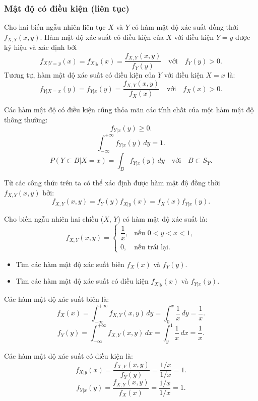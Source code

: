 \documentclass[12pt,a4paper]{article}
\begin{document}
\subsubsection{Mật độ có điều kiện (liên tục)}

\begin{dinhnghia}
Cho hai biến ngẫu nhiên liên tục $X$ và $Y$ có hàm mật độ xác suất đồng thời $f_{X,Y}(x, y)$. Hàm mật độ xác suất có điều kiện của $X$ với điều kiện $Y = y$ được ký hiệu và xác định bởi
\[
  f_{X|Y =y}(x) = f_{X|y}(x) = \dfrac{f_{X,Y}(x, y)}{f_Y(y)} \quad \text{với} \quad f_Y(y) > 0.
\]
Tương tự, hàm mật độ xác suất có điều kiện của $Y$ với điều kiện $X = x$ là:
\[
  f_{Y|X=x}(y) = f_{Y|x}(y) = \dfrac{f_{X,Y}(x, y)}{f_X(x)} \quad \text{với} \quad f_X(x) > 0.
\]
\end{dinhnghia}

\begin{dinhly}
Các hàm mật độ có điều kiện cũng thỏa mãn các tính chất của một hàm mật độ thông thường:
\[
  f_{Y|x}(y) \ge 0.
\]
\[
  \displaystyle\int_{-\infty}^{+\infty} f_{Y|x}(y) \, dy = 1.
\]
\[
  P(Y \subset B|X = x) = \displaystyle\int_{B} f_{Y|x}(y) \, dy \quad \text{với} \quad B \subset S_Y.
\]

Từ các công thức trên ta có thể xác định được hàm mật độ đồng thời $f_{X,Y}(x, y)$ bởi:
\[
  f_{X,Y}(x, y) = f_Y(y)f_{X|y}(x) = f_X(x)f_{Y|x}(y).
\]
\end{dinhly}

\begin{vidu}
Cho biến ngẫu nhiên hai chiều ($X$, $Y$) có hàm mật độ xác suất là:
\[
  f_{X,Y}(x, y) = \begin{cases}
    \dfrac{1}{x}, & \text{nếu } 0 < y < x < 1, \\
    0, & \text{nếu trái lại}.
  \end{cases}
\]
\begin{itemize}
  \item Tìm các hàm mật độ xác suất biên $f_X(x)$ và $f_Y(y)$.
  \item Tìm các hàm mật độ xác suất có điều kiện $f_{X|y}(x)$ và $f_{Y|x}(y)$.
\end{itemize}
Các hàm mật độ xác suất biên là:
\[
  f_X(x) = \displaystyle\int_{-\infty}^{+\infty} f_{X,Y}(x, y) \, dy = \displaystyle\int_{0}^{x} \dfrac{1}{x} \, dy = \dfrac{1}{x}.
\]
\[
  f_Y(y) = \displaystyle\int_{-\infty}^{+\infty} f_{X,Y}(x, y) \, dx = \displaystyle\int_{y}^{1} \dfrac{1}{x} \, dx = \dfrac{1}{x}.
\]

Các hàm mật độ xác suất có điều kiện là:
\[
  f_{X|y}(x) = \dfrac{f_{X,Y}(x, y)}{f_Y(y)} = \dfrac{1/x}{1/x} = 1.
\]
\[
  f_{Y|x}(y) = \dfrac{f_{X,Y}(x, y)}{f_X(x)} = \dfrac{1/x}{1/x} = 1.
\]
\end{vidu}
\end{document}
